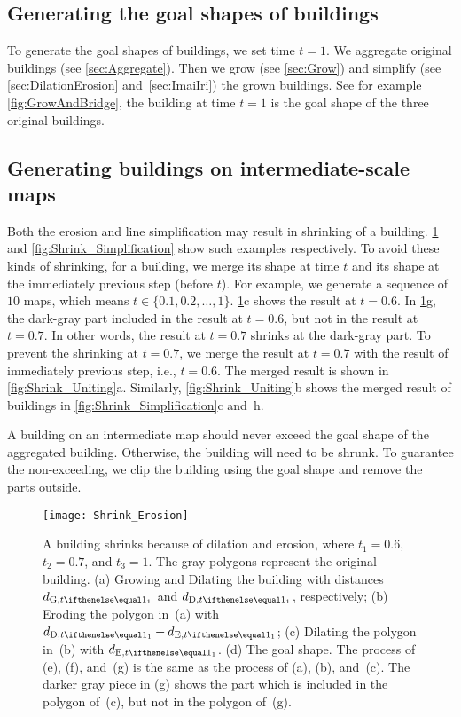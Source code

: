 \subsection{Generating the goal shapes of buildings}
\label{sec:Goal}
To generate the goal shapes of buildings, we set time $t=1$.
We aggregate original buildings (see \sect\ref{sec:Aggregate}).
Then we grow (see \sect\ref{sec:Grow}) 
and simplify 
(see \sects\ref{sec:DilationErosion} and~\ref{sec:ImaiIri}) the grown buildings.
See for example \fig\ref{fig:GrowAndBridge}, 
the building at time $t=1$ is the goal shape of the three original buildings.




\subsection{Generating buildings on intermediate-scale maps}
\label{sec:Unite}

Both the erosion and line simplification may result in shrinking of a 
building.
\fig\ref{fig:Shrink_Erosion} and \fig\ref{fig:Shrink_Simplification} show such 
examples respectively.
To avoid these kinds of shrinking,
for a building, we merge its shape at time $t$ 
and its shape at the immediately previous step (before $t$). 
For example, we generate a sequence of $10$ maps,
which means $t \in \{0.1, 0.2, \dots, 1\}$.
\fig\ref{fig:Shrink_Erosion}c shows the result at $t=0.6$.
In \fig\ref{fig:Shrink_Erosion}g, 
the dark-gray part included in the result at $t=0.6$,
but not in the result at $t=0.7$.
In other words, the result at $t=0.7$ shrinks at the dark-gray part.
To prevent the shrinking at $t=0.7$, we merge the result at $t=0.7$ with the 
result of immediately previous step, i.e., $t=0.6$.
The merged result is shown in \fig\ref{fig:Shrink_Uniting}a.
Similarly, \fig\ref{fig:Shrink_Uniting}b shows the merged result of buildings 
in \fig\ref{fig:Shrink_Simplification}c and~h.

A building on an intermediate map should never exceed
the goal shape of the aggregated building. 
Otherwise, the building will need to be shrunk.
To guarantee the non-exceeding, 
we clip the building using the goal shape 
and remove the parts outside.

\begin{figure}[tb]
	\centering
	\texttt{[image: Shrink\_Erosion]}
	\caption{A building shrinks because of dilation and erosion, 
		where $t_1=0.6$, $t_2=0.7$, and $t_3=1$.
		The gray polygons represent the original building.
		(a) Growing and Dilating the building with distances $\dtrm[1]{G}$ and 
		$\dtrm[1]{D}$, respectively;
		(b) Eroding the polygon in~(a) with $\dtrm[1]{D} + \dtrm[1]{E}$;
		(c) Dilating the polygon in~(b) with $\dtrm[1]{E}$.
		(d) The goal shape.
		The process of (e), (f), and~(g) is the same as the process of (a), 
		(b), and~(c).
		The darker gray piece in (g) shows 
		the part which is included in the polygon of~(c), 
		but not in the polygon of~(g).
	}
	\label{fig:Shrink_Erosion}
\end{figure}

